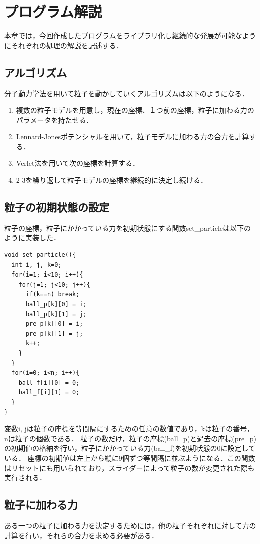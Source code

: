 \chapter{プログラム解説}
本章では，今回作成したプログラムをライブラリ化し継続的な発展が可能なようにそれぞれの処理の解説を記述する．

\section{アルゴリズム}
分子動力学法を用いて粒子を動かしていくアルゴリズムは以下のようになる．
\begin{enumerate}
  \item 複数の粒子モデルを用意し，現在の座標、１つ前の座標，粒子に加わる力のパラメータを持たせる．
  \item Lennard-Jonesポテンシャルを用いて，粒子モデルに加わる力の合力を計算する．
  \item Verlet法を用いて次の座標を計算する．
  \item 2-3を繰り返して粒子モデルの座標を継続的に決定し続ける．
\end{enumerate}


\section{粒子の初期状態の設定}
粒子の座標，粒子にかかっている力を初期状態にする関数set\_particleは以下のように実装した．
\begin{screen}
{\small
\begin{verbatim}
void set_particle(){
  int i, j, k=0;
  for(i=1; i<10; i++){
    for(j=1; j<10; j++){
      if(k==n) break;
      ball_p[k][0] = i;
      ball_p[k][1] = j;
      pre_p[k][0] = i;
      pre_p[k][1] = j;
      k++;
    }
  }
  for(i=0; i<n; i++){
    ball_f[i][0] = 0; 
    ball_f[i][1] = 0;
  } 
} 
\end{verbatim}}
\end{screen}
変数i, jは粒子の座標を等間隔にするための任意の数値であり，kは粒子の番号，nは粒子の個数である．
粒子の数だけ，粒子の座標(ball\_p)と過去の座標(pre\_p)の初期値の格納を行い，粒子にかかっている力(ball\_f)を初期状態の0に設定している．
座標の初期値は左上から縦に9個ずつ等間隔に並ぶようになる．この関数はリセットにも用いられており，スライダーによって粒子の数が変更された際も実行される．

\section{粒子に加わる力}
ある一つの粒子に加わる力を決定するためには，他の粒子それぞれに対して力の計算を行い，それらの合力を求める必要がある．
